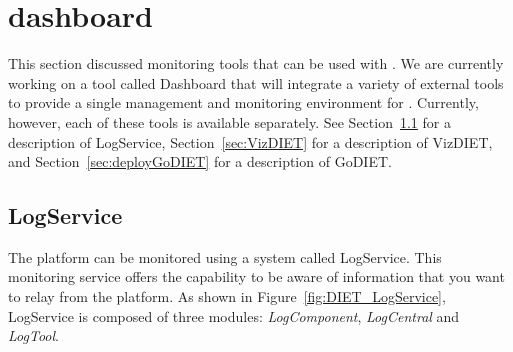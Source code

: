 
\chapter{\diet dashboard}
\label{ch:dashboard}

This section discussed monitoring tools that can be used with \diet.  We are
currently working on a tool called \diet Dashboard that will integrate a
variety of external tools to provide a single management and monitoring
environment for \diet. Currently, however, each of these tools is available
separately. See Section~\ref{sec:LogService} for a description of LogService,
Section~\ref{sec:VizDIET} for a description of VizDIET, and
Section~\ref{sec:deployGoDIET} for a description of GoDIET.

\section{LogService}
\label{sec:LogService}

The \diet platform can be monitored using a system called LogService. 
This monitoring service offers the capability to be aware of information that
you want to relay from the platform.  As shown in
Figure~\ref{fig:DIET_LogService}, LogService is composed of three modules:
\textit{LogComponent}, \textit{LogCentral} and \textit{LogTool}.

